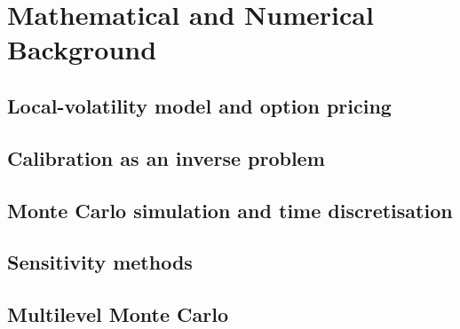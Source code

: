\chapter{Mathematical and Numerical Background}
\label{ch:background}

\section{Local-volatility model and option pricing}
\label{sec:bg-localvol}

\section{Calibration as an inverse problem}
\label{sec:bg-calibration}

\section{Monte Carlo simulation and time discretisation}
\label{sec:bg-mc}

\section{Sensitivity methods}
\label{sec:bg-sensitivities}

\section{Multilevel Monte Carlo}
\label{sec:bg-mlmc}
